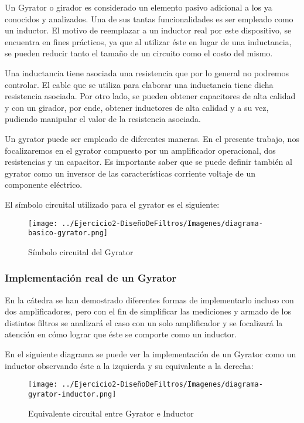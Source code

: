 Un Gyrator o girador es considerado un elemento pasivo adicional a los ya conocidos y analizados. Una de sus tantas funcionalidades es ser empleado como un inductor. 
El motivo de reemplazar a un inductor real por este dispositivo, se encuentra en fines prácticos, ya que al utilizar éste en lugar de una inductancia, se pueden reducir 
tanto el tamaño de un circuito como el costo del mismo. 

Una inductancia tiene asociada una resistencia que por lo general no podremos controlar. El cable que se utiliza para elaborar una inductancia tiene dicha resistencia asociada. 
Por otro lado, se pueden obtener capacitores de alta calidad y con un girador, por ende, obtener inductores de alta calidad y a su vez, pudiendo manipular el valor de la resistencia asociada.

Un gyrator puede ser empleado de diferentes maneras. En el presente trabajo, nos focalizaremos en el gyrator compuesto por un amplificador operacional, dos resistencias y un capacitor.
Es importante saber que se puede definir también al gyrator como un inversor de las características corriente voltaje de un componente eléctrico.

El símbolo circuital utilizado para el gyrator es el siguiente:

\begin{figure}[H]
    \centering
    \texttt{[image: ../Ejercicio2-DiseñoDeFiltros/Imagenes/diagrama-basico-gyrator.png]}
    \caption{Símbolo circuital del Gyrator}
\end{figure}

\subsubsection{Implementación real de un Gyrator}

En la cátedra se han demostrado diferentes formas de implementarlo incluso con dos amplificadores, pero con el fin de simplificar las mediciones
y armado de los distintos filtros se analizará el caso con un solo amplificador y se focalizará la atención en cómo lograr que éste se comporte como un 
inductor.

En el siguiente diagrama se puede ver la implementación de un Gyrator como un inductor observando éste a la izquierda y su equivalente a la derecha:

\begin{figure}[H]
    \centering
    \texttt{[image: ../Ejercicio2-DiseñoDeFiltros/Imagenes/diagrama-gyrator-inductor.png]}
    \caption{Equivalente circuital entre Gyrator e Inductor}
\end{figure}


